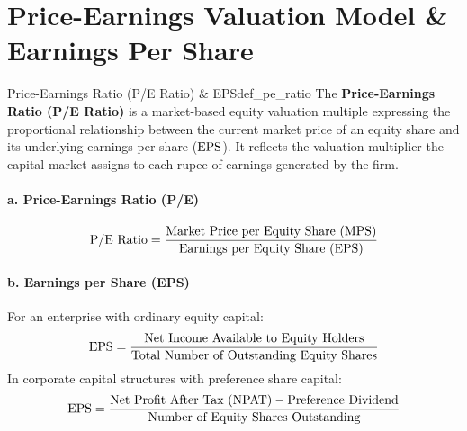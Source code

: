 \section{Price-Earnings Valuation Model \& Earnings Per Share}

\begin{definition}{Price-Earnings Ratio (P/E Ratio) \& EPS}{def_pe_ratio}
The \textbf{Price-Earnings Ratio (P/E Ratio)} is a market-based equity valuation multiple expressing the proportional relationship between the current market price of an equity share and its underlying earnings per share ($\operatorname{EPS}$). It reflects the valuation multiplier the capital market assigns to each rupee of earnings generated by the firm.
\end{definition}

\begin{formulabox}
\paragraph{a. Price-Earnings Ratio (P/E)}
\begin{equation}
    \text{P/E Ratio} = \frac{\text{Market Price per Equity Share } (\operatorname{MPS})}{\text{Earnings per Equity Share } (\operatorname{EPS})}
\end{equation}

\vspace{0.3em}
\paragraph{b. Earnings per Share (EPS)}
For an enterprise with ordinary equity capital:
\begin{equation}
    \operatorname{EPS} = \frac{\text{Net Income Available to Equity Holders}}{\text{Total Number of Outstanding Equity Shares}}
\end{equation}
In corporate capital structures with preference share capital:
\begin{equation}
    \operatorname{EPS} = \frac{\text{Net Profit After Tax } (\operatorname{NPAT}) - \text{Preference Dividend}}{\text{Number of Equity Shares Outstanding}}
\end{equation}
\end{formulabox}

